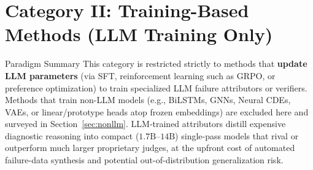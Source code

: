 \section{Category II: Training-Based Methods (LLM Training Only)}\label{sec:training}

\begin{summarybox}[s2]{Paradigm Summary \hfill \trainbadge}
This category is restricted strictly to methods that \textbf{update LLM parameters} (via SFT, reinforcement learning such as GRPO, or preference optimization) to train specialized LLM failure attributors or verifiers. Methods that train non-LLM models (e.g., BiLSTMs, GNNs, Neural CDEs, VAEs, or linear/prototype heads atop frozen embeddings) are excluded here and surveyed in Section~\ref{sec:nonllm}. LLM-trained attributors distill expensive diagnostic reasoning into compact ($1.7\text{B}$--$14\text{B}$) single-pass models that rival or outperform much larger proprietary judges, at the upfront cost of automated failure-data synthesis and potential out-of-distribution generalization risk.
\end{summarybox}

